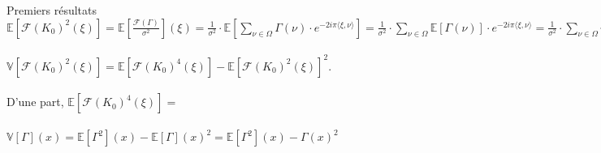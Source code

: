 \documentclass{article} %
\begin{document}
\begin{section}{Premiers résultats}
\\
$\mathbb{E}[\mathcal{F}(K_0)^2(\xi)] = \mathbb{E}[\frac{\mathcal{F}(\Gamma)}{\sigma^2}](\xi) = \frac{1}{\sigma^2}\cdot \mathbb{E}[\sum_{ \nu \in \Omega}{\Gamma(\nu) \cdot e^{-2i \pi \langle \xi,\nu \rangle}}] = \frac{1}{\sigma^2}\cdot \sum_{ \nu \in \Omega}{\mathbb{E}[\Gamma(\nu)] \cdot e^{-2i \pi \langle \xi,\nu \rangle}} = 
\frac{1}{\sigma^2}\cdot \sum_{ \nu \in \Omega}{\gamma(\nu) \cdot e^{-2i \pi \langle \xi,\nu \rangle}} =\frac{1}{\sigma^2}\cdot \mathcal{F}(\gamma)(\xi) =\mathcal{F}(A(k_0))(\xi) = \mathcal{F}(k_0)^2(\xi) $
\\
\\
$\mathbb{V}[\mathcal{F}(K_0)^2(\xi)] = \mathbb{E}[\mathcal{F}(K_0)^4(\xi)] - \mathbb{E}[\mathcal{F}(K_0)^2(\xi)]^2$.
\\
\\
D'une part, $\mathbb{E}[\mathcal{F}(K_0)^4(\xi)]= $
\\
\\
$\mathbb{V}[\Gamma](x) = \mathbb{E}[\Gamma^2](x) - \mathbb{E}[\Gamma](x)^2 =  \mathbb{E}[\Gamma^2](x) - \Gamma(x)^2$



\end{section}
\end{document}
